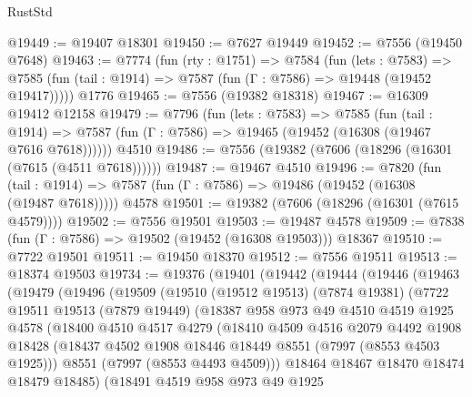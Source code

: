 \begin{lexlean}{RustStd}
\begin{coremodule}
{\begin{coremodule}
{{{{{{{{{{{{{{{{{{{{{{{{{{{{{{{{{{{{{{{{{{{@19449 := @19407 @18301
@19450 := @7627 @19449
@19452 := @7556 (@19450 @7648)
@19463 := @7774
    (fun (rty : @1751) =>
    @7584
      (fun (lets : @7583) =>
      @7585 (fun (tail : @1914) => @7587 (fun (Γ : @7586) => @19448 (@19452 @19417)))))
    @1776
@19465 := @7556 (@19382 @18318)
@19467 := @16309 @19412 @12158
@19479 := @7796
    (fun (lets : @7583) =>
    @7585
      (fun (tail : @1914) =>
      @7587 (fun (Γ : @7586) => @19465 (@19452 (@16308 (@19467 @7616 @7618))))))
    @4510
@19486 := @7556 (@19382 (@7606 (@18296 (@16301 (@7615 (@4511 @7618))))))
@19487 := @19467 @4510
@19496 := @7820
    (fun (tail : @1914) => @7587 (fun (Γ : @7586) => @19486 (@19452 (@16308 (@19487 @7618)))))
    @4578
@19501 := @19382 (@7606 (@18296 (@16301 (@7615 @4579))))
@19502 := @7556 @19501
@19503 := @19487 @4578
@19509 := @7838 (fun (Γ : @7586) => @19502 (@19452 (@16308 @19503))) @18367
@19510 := @7722 @19501
@19511 := @19450 @18370
@19512 := @7556 @19511
@19513 := @18374 @19503
@19734 := @19376
    (@19401
      (@19442
        (@19444
          (@19446
            (@19463
              (@19479
                (@19496
                  (@19509
                    (@19510
                      (@19512 @19513)
                      (@7874 @19381)
                      (@7722
                        @19511
                        @19513
                        (@7879 @19449)
                        (@18387
                          @958
                          @973
                          @49
                          @4510
                          @4519
                          @1925
                          @4578
                          (@18400
                            @4510
                            @4517
                            @4279
                            (@18410
                              @4509
                              @4516
                              @2079
                              @4492
                              @1908
                              @18428
                              (@18437 @4502 @1908 @18446 @18449 @8551 (@7997 (@8553 @4503 @1925)))
                              @8551
                              (@7997 (@8553 @4493 @4509)))
                            @18464
                            @18467
                            @18470
                            @18474
                            @18479
                            @18485)
                          (@18491
                            @4519
                            @958
                            @973
                            @49
                            @1925
}}}}}}}}}}}}}}}}}}}}}}}}}}}}}}}}}}}}}}}}}}}
\end{coremodule}}
\end{coremodule}
\end{lexlean}

